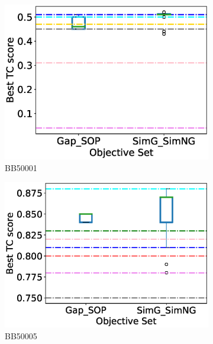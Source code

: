 \begin{figure}[!htbp]
\begin{adjustwidth}{-1cm}{-1cm}
		\begin{subfigure}{0.22\textwidth}
			\includegraphics[width=\columnwidth]{Figure/summary/precomputedInit/Balibase/BB50001_objset_tc_rank_2}
			\caption{BB50001}
		\end{subfigure}	
		\begin{subfigure}{0.22\textwidth}
			\includegraphics[width=\columnwidth]{Figure/summary/precomputedInit/Balibase/BB50005_objset_tc_rank_2}
			\caption{BB50005}
		\end{subfigure}
		\begin{subfigure}{0.22\textwidth}

\end{subfigure}
\end{adjustwidth}
\end{figure}
